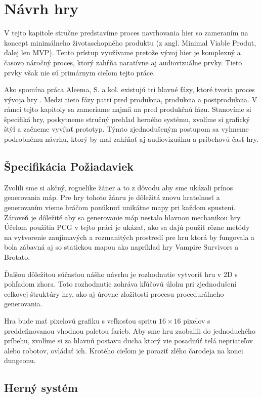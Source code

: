 \chapter{Návrh hry}

V tejto kapitole stručne predstavíme proces navrhovania hier so zameraním na koncept minimálneho životaschopného produktu (z angl. Minimal Viable Produt, ďalej len MVP). Tento prístup využívame pretože vývoj hier je komplexný a časovo náročný proces, ktorý zahŕňa naratívne aj audiovizuálne prvky. Tieto prvky však nie sú primárnym cieľom tejto práce.

Ako spomína práca Aleema, S. a kol. existujú tri hlavné fázy, ktoré tvoria proces vývoja hry \cite{aleem2016game}. Medzi tieto fázy patrí pred produkcia, produkcia a postprodukcia. V rámci tejto kapitoly sa zameriame najmä na pred produkčnú fázu. Stanovíme si špecifiká hry, poskytneme stručný prehľad herného systému, zvolíme si grafický štýl a začneme vyvíjať prototyp. Týmto zjednodušeným postupom sa vyhneme podrobnému návrhu, ktorý by mal zahŕňať aj audiovizuálnu a príbehovú časť hry.

\section{Špecifikácia Požiadaviek}

Zvolili sme si akčný, roguelike žáner a to z dôvodu aby sme ukázali prínos generovania máp. Pre hry tohoto žánru je dôležitá znovu hrateľnosť a generovaním vieme hráčom ponúknuť unikátne mapy pri každom spustení. Zároveň je dôležité aby sa generovanie máp nestalo hlavnou mechanikou hry. Účelom použitia PCG v tejto práci je ukázať, ako sa dajú použiť rôzne metódy na vytvorenie zaujímavých a rozmanitých prostredí pre hru ktorá by fungovala a bola zábavná aj so statickou mapou ako napríklad hry Vampire Survivors a Brotato.

Ďalšou dôležitou súčasťou nášho návrhu je rozhodnutie vytvoriť hru v 2D s pohľadom zhora. Toto rozhodnutie zohráva kľúčovú úlohu pri zjednodušení celkovej štruktúry hry, ako aj úrovne zložitosti procesu procedurálneho generovania.

Hra bude mať pixelovú grafiku s veľkosťou spritu $16\times16$ pixelov s preddefinovanou vhodnou paletou farieb. Aby sme hru zaobalili do jednoduchého príbehu, zvolíme si za hlavnú postavu ducha ktorý vie posadnúť telá nepriateľov alebo robotov, ovládať ich. Krotého cieľom je poraziť zlého čarodeja na konci dungeonu.

\section{Herný systém}

